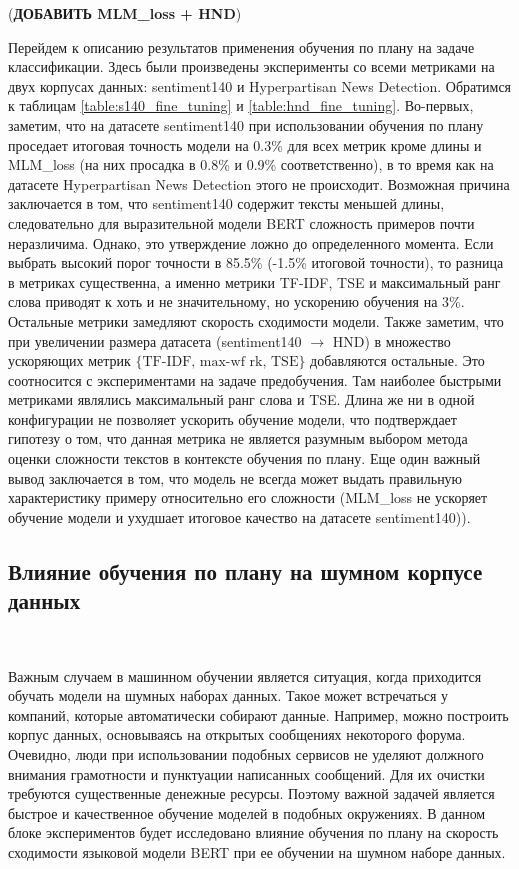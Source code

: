 \documentclass{spbau-diploma}
\begin{document}
({\bf ДОБАВИТЬ MLM\_loss + HND})

Перейдем к описанию результатов применения обучения по плану на задаче классификации. Здесь были произведены эксперименты со всеми метриками на двух корпусах данных: sentiment140 и Hyperpartisan News Detection. Обратимся к таблицам \ref{table:s140_fine_tuning} и \ref{table:hnd_fine_tuning}. Во-первых, заметим, что на датасете sentiment140 при использовании обучения по плану проседает итоговая точность модели на 0.3\% для всех метрик кроме длины и MLM\_loss (на них просадка в 0.8\% и 0.9\% соответственно), в то время как на датасете Hyperpartisan News Detection этого не происходит. Возможная причина заключается в том, что sentiment140 содержит тексты меньшей длины, следовательно для выразительной модели BERT сложность примеров почти неразличима. Однако, это утверждение ложно до определенного момента. Если выбрать высокий порог точности в 85.5\% (-1.5\% итоговой точности), то разница в метриках существенна, а именно метрики TF-IDF, TSE и максимальный ранг слова приводят к хоть и не значительному, но ускорению обучения на 3\%. Остальные метрики замедляют скорость сходимости модели. Также заметим, что при увеличении размера датасета (sentiment140 $\rightarrow$ HND) в множество ускоряющих метрик $\{\text{TF-IDF, max-wf rk, TSE}\}$ добавляются остальные. Это соотносится с экспериментами на задаче предобучения. Там наиболее быстрыми метриками являлись максимальный ранг слова и TSE. Длина же ни в одной конфигурации не позволяет ускорить обучение модели, что подтверждает гипотезу о том, что данная метрика не является разумным выбором метода оценки сложности текстов в контексте обучения по плану. Еще один важный вывод заключается в том, что модель не всегда может выдать правильную характеристику примеру относительно его сложности (MLM\_loss не ускоряет обучение модели и ухудшает итоговое качество на датасете sentiment140)).

\pagebreak
\subsection{Влияние обучения по плану на шумном корпусе данных}
\ 

Важным случаем в машинном обучении является ситуация, когда приходится обучать модели на шумных наборах данных. Такое может встречаться у компаний, которые автоматически собирают данные. Например, можно построить корпус данных, основываясь на открытых сообщениях некоторого форума. Очевидно, люди при использовании подобных сервисов не уделяют должного внимания грамотности и пунктуации написанных сообщений. Для их очистки требуются существенные денежные ресурсы. Поэтому важной задачей является быстрое и качественное обучение моделей в подобных окружениях. В данном блоке экспериментов будет исследовано влияние обучения по плану на скорость сходимости языковой модели BERT при ее обучении на шумном наборе данных.
\end{document}

